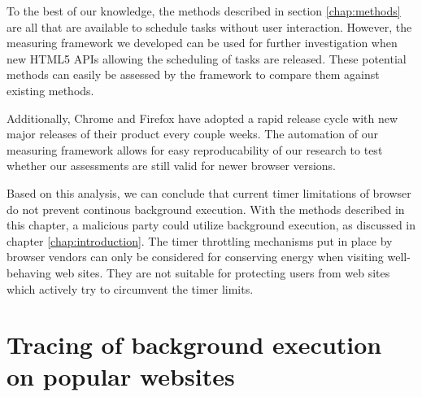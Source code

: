 \documentclass[
	ruledheaders=section,%
	class=report,%
	thesis={type=bachelor},%
	accentcolor=9c,%
	custommargins=true,%
	marginpar=false,%
	parskip=half-,%
	fontsize=11pt,%
]{tudapub}
\begin{document}
  To the best of our knowledge, the methods described in section \ref{chap:methods} are all that are available to schedule tasks without user interaction. However, the measuring framework we developed can be used for further investigation when new HTML5 APIs allowing the scheduling of tasks are released. These potential methods can easily be assessed by the framework to compare them against existing methods.

  Additionally, Chrome and Firefox have adopted a rapid release cycle with new major releases of their product every couple weeks. The automation of our measuring framework allows for easy reproducability of our research to test whether our assessments are still valid for newer browser versions.

  Based on this analysis, we can conclude that current timer limitations of browser do not prevent continous background execution. With the methods described in this chapter, a malicious party could utilize background execution, as discussed in chapter \ref{chap:introduction}. The timer throttling mechanisms put in place by browser vendors can only be considered for conserving energy when visiting well-behaving web sites. They are not suitable for protecting users from web sites which actively try to circumvent the timer limits.

  \newpage
  \chapter{Tracing of background execution on popular websites}
  \label{chap:tracing}
\end{document}
